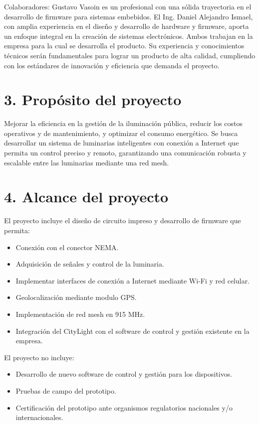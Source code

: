 \documentclass[
11pt, %
]{charter}
\begin{document}
Colaboradores: Gustavo Vasoin es un profesional con una sólida trayectoria en el desarrollo de firmware para sistemas embebidos. El Ing. Daniel Alejandro Ismael, con amplia experiencia en el  diseño y desarrollo de hardware y firmware, aporta un enfoque integral en la creación de sistemas electrónicos. Ambos trabajan en la empresa para la cual se desarrolla el producto. Su experiencia y conocimientos técnicos serán fundamentales para lograr un producto de alta calidad, cumpliendo con los estándares de innovación y eficiencia que demanda el proyecto.

\section{3. Propósito del proyecto}
\label{sec:proposito}

Mejorar la eficiencia en la gestión de la iluminación pública, reducir los costos operativos y de mantenimiento, y optimizar el consumo energético. Se busca desarrollar un sistema de luminarias inteligentes con conexión a Internet que permita un control preciso y remoto, garantizando una comunicación robusta y escalable entre las luminarias mediante una red mesh.

\pagebreak

\section{4. Alcance del proyecto}
\label{sec:alcance}

El proyecto incluye el diseño de circuito impreso y desarrollo de firmware que permita:
\begin{itemize}
	\item Conexión con el conector NEMA.
	\item Adquisición de señales y control de la luminaria.
	\item Implementar interfaces de conexión a Internet mediante Wi-Fi y red celular.
	\item Geolocalización mediante modulo GPS.
	\item Implementación de red mesh en 915 MHz.
	\item Integración del CityLight con el software de control y gestión existente en la empresa.
\end{itemize}	

El proyecto no incluye:
\begin{itemize}
	\item Desarrollo de nuevo software de control y gestión para los dispositivos.
	\item Pruebas de campo del prototipo.
	\item Certificación del prototipo ante organismos regulatorios nacionales y/o internacionales.
\end{itemize}
\end{document}
